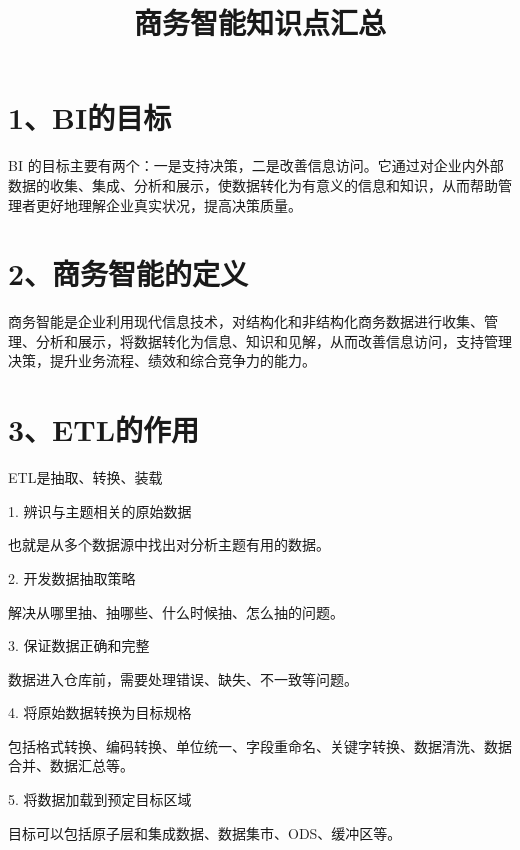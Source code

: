 \documentclass[UTF8,zihao=-4]{ctexart}
\begin{document}
\title{商务智能知识点汇总}
\author{}
\date{}
\maketitle
\tableofcontents
\newpage
\section*{1、BI的目标}

BI 的目标主要有两个：一是支持决策，二是改善信息访问。它通过对企业内外部数据的收集、集成、分析和展示，使数据转化为有意义的信息和知识，从而帮助管理者更好地理解企业真实状况，提高决策质量。\par

\newpage
\section*{2、商务智能的定义}

商务智能是企业利用现代信息技术，对结构化和非结构化商务数据进行收集、管理、分析和展示，将数据转化为信息、知识和见解，从而改善信息访问，支持管理决策，提升业务流程、绩效和综合竞争力的能力。\par

\newpage
\section*{3、ETL的作用}

ETL是抽取、转换、装载\par

1. 辨识与主题相关的原始数据\par
也就是从多个数据源中找出对分析主题有用的数据。\par

2. 开发数据抽取策略\par
解决从哪里抽、抽哪些、什么时候抽、怎么抽的问题。\par

3. 保证数据正确和完整\par
数据进入仓库前，需要处理错误、缺失、不一致等问题。\par

4. 将原始数据转换为目标规格\par
包括格式转换、编码转换、单位统一、字段重命名、关键字转换、数据清洗、数据合并、数据汇总等。\par

5. 将数据加载到预定目标区域\par
目标可以包括原子层和集成数据、数据集市、ODS、缓冲区等。\par
\end{document}
